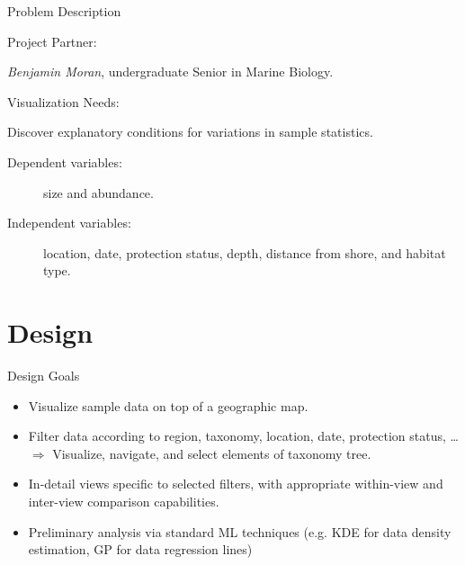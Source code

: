 \documentclass{beamer}
\begin{document}
\begin{frame}{Problem Description}

  \begin{block}{Project Partner:}

    \emph{Benjamin Moran}, undergraduate Senior in Marine Biology.

  \end{block}

  \begin{block}{Visualization Needs:}

    Discover explanatory conditions for variations in sample statistics.
    
    \begin{description}

      \item[Dependent variables:]  size and abundance.

      \item[Independent variables:]  location, date, protection status, depth,
        distance from shore, and habitat type.

    \end{description}

  \end{block}

\end{frame}

\section{Design}

\begin{frame}{Design Goals}

  \begin{itemize}

    \item Visualize sample data on top of a geographic map.

    \item Filter data according to region, taxonomy, location, date, protection
      status, \dots \\
    $\Rightarrow$ Visualize, navigate, and select elements of taxonomy tree.

    \item In-detail views specific to selected filters, with appropriate
      within-view and inter-view comparison capabilities.

    \item Preliminary analysis via standard ML techniques (e.g. KDE for data
      density estimation, GP for data regression lines)

  \end{itemize}

\end{frame}
\end{document}
